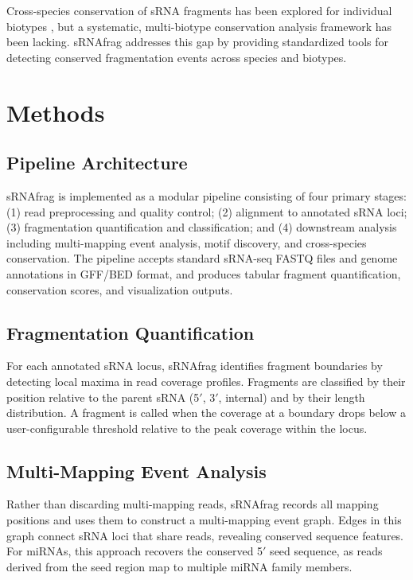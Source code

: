 \documentclass[11pt]{article}
\begin{document}
Cross-species conservation of sRNA fragments has been explored for individual biotypes \citep{fromm2015,shi2021}, but a systematic, multi-biotype conservation analysis framework has been lacking. sRNAfrag addresses this gap by providing standardized tools for detecting conserved fragmentation events across species and biotypes.

\section{Methods}

\subsection{Pipeline Architecture}

sRNAfrag is implemented as a modular pipeline consisting of four primary stages: (1) read preprocessing and quality control; (2) alignment to annotated sRNA loci; (3) fragmentation quantification and classification; and (4) downstream analysis including multi-mapping event analysis, motif discovery, and cross-species conservation. The pipeline accepts standard sRNA-seq FASTQ files and genome annotations in GFF/BED format, and produces tabular fragment quantification, conservation scores, and visualization outputs.

\subsection{Fragmentation Quantification}

For each annotated sRNA locus, sRNAfrag identifies fragment boundaries by detecting local maxima in read coverage profiles. Fragments are classified by their position relative to the parent sRNA (5$'$, 3$'$, internal) and by their length distribution. A fragment is called when the coverage at a boundary drops below a user-configurable threshold relative to the peak coverage within the locus.

\subsection{Multi-Mapping Event Analysis}

Rather than discarding multi-mapping reads, sRNAfrag records all mapping positions and uses them to construct a multi-mapping event graph. Edges in this graph connect sRNA loci that share reads, revealing conserved sequence features. For miRNAs, this approach recovers the conserved 5$'$ seed sequence, as reads derived from the seed region map to multiple miRNA family members.
\end{document}

